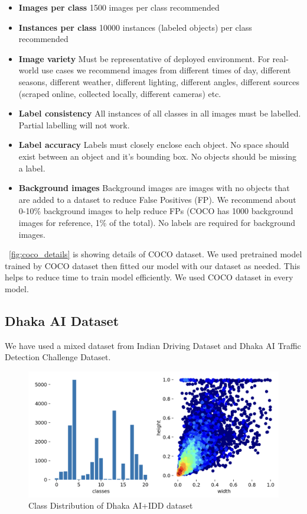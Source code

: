 \begin{itemize}
  \item \textbf{Images per class} 1500 images per class recommended
  \item \textbf{Instances per class} 10000 instances (labeled objects) per class recommended
  \item \textbf{Image variety} Must be representative of deployed environment. For real-world use cases we recommend images from different times of day, different seasons, different weather, different lighting, different angles, different sources (scraped online, collected locally, different cameras) etc.
 \item \textbf{Label consistency} All instances of all classes in all images must be labelled. Partial labelling will not work.
 \item \textbf{Label accuracy} Labels must closely enclose each object. No space should exist between an object and it's bounding box. No objects should be missing a label.
 \item \textbf{Background images} Background images are images with no objects that are added to a dataset to reduce False Positives (FP). We recommend about 0-10\% background images to help reduce FPs (COCO has 1000 background images for reference, 1\% of the total). No labels are required for background images.
\end{itemize}



~\ref{fig:coco_details} is showing details of COCO dataset. We used pretrained model trained by COCO dataset then fitted our model with our dataset as needed. This helps to reduce time to train model efficiently. We used COCO dataset in every model.

\subsection{Dhaka AI Dataset}
We have used  a mixed dataset from Indian Driving Dataset and Dhaka AI Traffic Detection Challenge Dataset.

\begin{figure}[ht]
    \centering
    \includegraphics[max width=\textwidth]{images/ours/dhaka-ai+idd.png}
   \caption[Class Distribution of Dhaka AI+IDD dataset]{Class Distribution of Dhaka AI+IDD dataset}
    \label{fig:dhakaai_dataset}
\end{figure}

